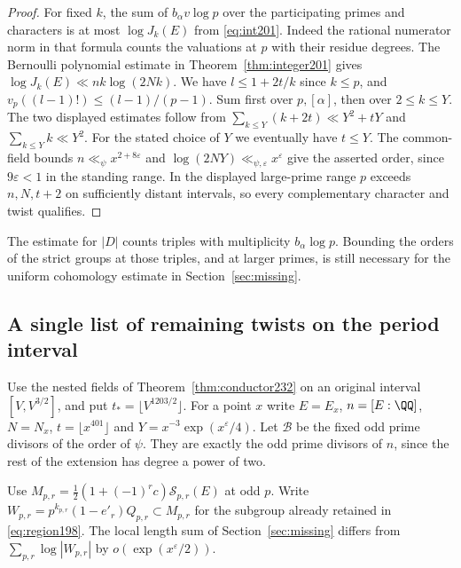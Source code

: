 \documentclass[a4paper,11pt]{article}
\theoremstyle{definition}
\theoremstyle{remark}
\numberwithin{equation}{section}
\begin{document}
\begin{proof}
For fixed \(k\), the sum of \(b_\alpha v\log p\) over the
participating primes and characters is at most \(\log J_k(E)\)
from \eqref{eq:int201}. Indeed the rational numerator norm in
that formula counts the valuations at \(p\) with their residue
degrees. The Bernoulli polynomial estimate in
Theorem~\ref{thm:integer201} gives
\(\log J_k(E)\ll nk\log(2Nk)\). We have \(l\le1+2t/k\) since
\(k\le p\), and \(v_p((l-1)!)\le(l-1)/(p-1)\).
Sum first over \(p,[\alpha]\), then over \(2\le k\le Y\).
The two displayed estimates follow from
\(\sum_{k\le Y}(k+2t)\ll Y^2+tY\) and \(\sum_{k\le Y}k\ll Y^2\).
For the stated choice of \(Y\) we eventually have \(t\le Y\).
The common-field bounds \(n\ll_\psi x^{2+8\varepsilon}\) and
\(\log(2NY)\ll_{\psi,\varepsilon}x^\varepsilon\) give the asserted
order, since \(9\varepsilon<1\) in the standing range. In the
displayed large-prime range \(p\) exceeds \(n,N,t+2\) on
sufficiently distant intervals, so every complementary character
and twist qualifies.
\end{proof}

The estimate for \(|D|\) counts triples with multiplicity
\(b_\alpha\log p\). Bounding the orders of the strict groups at
those triples, and at larger primes, is still necessary for
the uniform cohomology estimate in Section~\ref{sec:missing}.

\subsection{A single list of remaining twists on the period interval}\label{nav:II-75}
Use the nested fields of Theorem~\ref{thm:conductor232} on an
original interval \([V,V^{3/2}]\), and put \(t_*=\lfloor V^{1203/2}\rfloor\).
For a point \(x\) write \(E=E_x\), \(n=[E:\QQ]\), \(N=N_x\),
\(t=\lfloor x^{401}\rfloor\) and \(Y=x^{-3}\exp(x^\varepsilon/4)\).
Let \(\mathcal B\) be the fixed odd prime divisors of the order of
\(\psi\). They are exactly the odd prime divisors of \(n\), since
the rest of the extension has degree a power of two.

Use \(M_{p,r}=\frac12(1+(-1)^rc)\mathcal S_{p,r}(E)\) at odd
\(p\). Write \(W_{p,r}=p^{k_{p,r}}(1-e'_r)Q_{p,r}\subset M_{p,r}\)
for the subgroup already retained in \eqref{eq:region198}. The local
length sum of Section~\ref{sec:missing} differs from
\(\sum_{p,r}\log|W_{p,r}|\) by \(o(\exp(x^\varepsilon/2))\).
\end{document}
